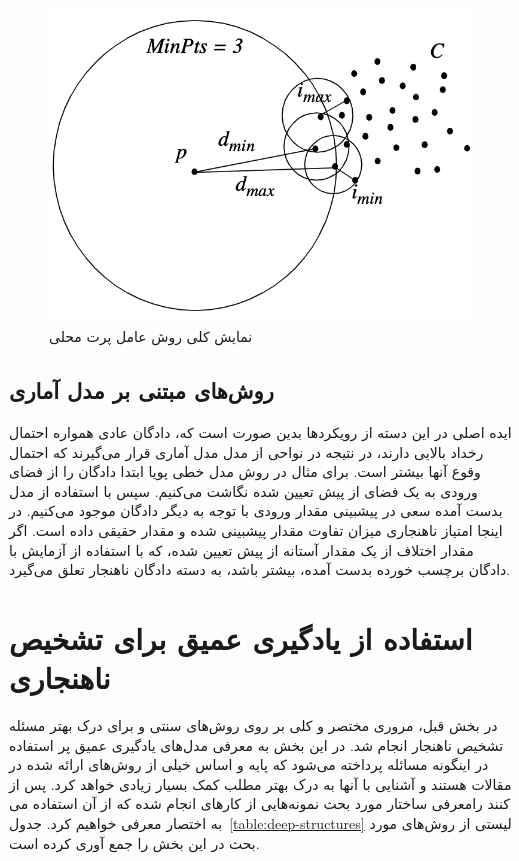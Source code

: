 \documentclass[12pt,a4paper]{report}
\theoremstyle{definition}
\theoremstyle{definition}
\begin{document}
	\begin{figure}[!h]
	\begin{center}
		\includegraphics[width=0.5\linewidth]{./images/figures/lof.png}
	\end{center}
	\caption{نمایش کلی روش عامل پرت محلی~\cite{10.1145/342009.335388}}
	\label{fig:lof}
	\centering
\end{figure}



\subsection{روش‌های مبتنی بر مدل آماری}
ایده اصلی در این دسته از رویکرد‌ها بدین صورت است که، دادگان عادی همواره احتمال رخداد بالایی دارند، در نتیجه در نواحی از مدل مدل آماری قرار می‌گیرند که احتمال وقوع آنها بیشتر است. برای مثال در روش مدل خطی پویا ابتدا دادگان را از فضای ورودی به یک فضای از پیش تعیین شده نگاشت می‌کنیم. سپس با استفاده از مدل بدست آمده سعی در پیشبینی مقدار ورودی با توجه به دیگر دادگان موجود می‌کنیم. در اینجا امتیاز ناهنجاری میزان تفاوت مقدار پیشبینی شده و مقدار حقیقی داده است. اگر مقدار اختلاف از یک مقدار آستانه از پیش تعیین شده، که با استفاده از آزمایش با دادگان برچسب خورده بدست آمده، بیشتر باشد، به دسته دادگان ناهنجار تعلق می‌گیرد.


\section{استفاده از یادگیری عمیق برای تشخیص ناهنجاری}
 در بخش قبل، مروری مختصر و کلی بر روی روش‌های سنتی و برای درک بهتر مسئله تشخیص ناهنجار انجام شد. در این بخش به معرفی مدل‌های یادگیری عمیق پر استفاده در اینگونه مسائله پرداخته می‌شود که پایه و اساس خیلی از روش‌های ارائه شده در مقالات هستند و آشنایی با آنها به درک بهتر مطلب کمک بسیار زیادی خواهد کرد. پس از معرفی ساختار مورد بحث نمونه‌هایی از کار‌های انجام شده که از آن استفاده می‌‎کنند را به اختصار معرفی خواهیم کرد. جدول~\ref{table:deep-structures} لیستی از روش‌های مورد بحث در این بخش را جمع آوری کرده است.
\end{document}

